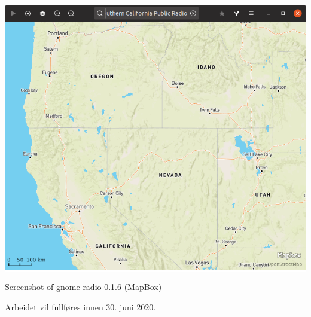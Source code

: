 \documentclass[a4paper,norsk,utf8]{report}
\begin{document}
\begin{center}
\colorbox{white}{\includegraphics[width=1.0\hsize]{gnome-radio-mapbox.png}}

{\blueem Screenshot of gnome-radio 0.1.6 (MapBox)}
\end{center}

Arbeidet vil fullføres innen 30. juni 2020.

\tableofcontents

\newpage
\end{document}
